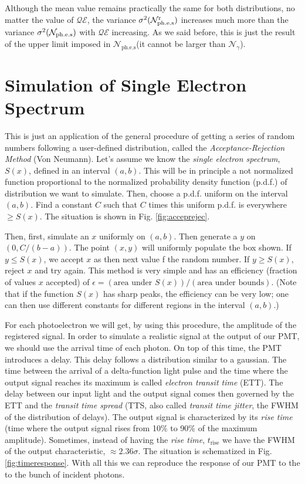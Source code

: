 \documentclass{article}
\def\QE{\ensuremath{\mathcal{QE}}\xspace}
\def\Nphot{\ensuremath{%
  \mathcal{N}_{\gamma}}\xspace}
\def\Ntrial{\ensuremath{%
  \mathcal{N}_{\mathrm{ph.e.s}}}\xspace}
\def\Nrand{\ensuremath{%
  \mathcal{N}^{\mathrm{r}}_{\mathrm{ph.e.s}}}\xspace}
\begin{document}
Although the mean value remains practically the same for both
distributions, no matter the value of \QE, the variance
$\sigma^2(\Nrand)$ increases much more than the variance
$\sigma^2(\Ntrial)$ with \QE increasing. As we said before, this is
just the result of the upper limit imposed in \Ntrial (it cannot be
larger than \Nphot).


\section{Simulation of Single Electron Spectrum}

This is just an application of the general procedure of getting a
series of random numbers following a user-defined distribution, called
the \emph{Acceptance-Rejection Method} (Von Neumann). Let's assume we
know the \emph{single electron spectrum}, $S(x)$, defined in an
interval $(a,b)$. This will be in principle a not normalized function
proportional to the normalized probability density function (p.d.f.)
of distribution we want to simulate. Then, choose a p.d.f. uniform on
the interval $(a,b)$. Find a constant $C$ such that $C$ times this
uniform p.d.f.  is everywhere $\geq S(x)$. The situation is shown in
Fig.  \ref{fig:acceprejec}. 

Then, first, simulate an $x$ uniformly on $(a,b)$. Then generate a $y$
on $(0,C/(b-a))$. The point $(x,y)$ will uniformly populate the box
shown. If $y\leq S(x)$, we accept $x$ as then next value f the random
number. If $y\geq S(x)$, reject $x$ and try again. This method is very
simple and has an efficiency (fraction of values $x$ accepted) of
$\epsilon = (\text{area under }S(x))/(\text{area under bounds})$.
(Note that if the function $S(x)$ has sharp peaks, the efficiency can
be very low; one can then use different constants for different
regions in the interval $(a,b)$.)

For each photoelectron we will get, by using this procedure, the
amplitude of the registered signal. In order to simulate a realistic
signal at the output of our PMT, we should use the arrival time of
each photon. On top of this time, the PMT introduces a delay. This
delay follows a distribution similar to a gaussian. The time between
the arrival of a delta-function light pulse and the time where the
output signal reaches its maximum is called \emph{electron transit
time} (ETT). The delay between our input light and the output signal
comes then governed by the ETT and the \emph{transit time spread}
(TTS, also called \emph{transit time jitter}, the FWHM of the
distribution of delays). The output signal is characterized by its
\emph{rise time} (time where the output signal rises from 10\% to
90\% of the maximum amplitude). Sometimes, instead of having the
\emph{rise time}, $t_{\mathrm{rise}}$ we have the FWHM of the output 
characteristic, $\approx 2.36\sigma$. The situation is schematized in
Fig. \ref{fig:timeresponse}. With all this we can reproduce
the response of our PMT to the to the bunch of incident photons.
\end{document}
